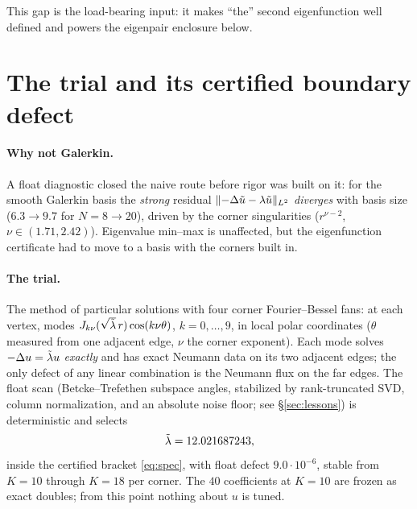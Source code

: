 \documentclass[11pt]{article}
\begin{document}
This gap is the load-bearing input: it makes ``the'' second
eigenfunction well defined and powers the eigenpair enclosure below.

\section{The trial and its certified boundary defect}\label{sec:trial}

\paragraph{Why not Galerkin.}
A float diagnostic closed the naive route before rigor was built on it:
for the smooth Galerkin basis the \emph{strong} residual
$\lVert -\Delta\tilde u-\lambda\tilde u \rVert_{L^2}$ \emph{diverges} with
basis size ($6.3\to9.7$ for $N=8\to20$), driven by the corner
singularities ($r^{\nu-2}$, $\nu\in(1.71,2.42)$). Eigenvalue min--max
is unaffected, but the eigenfunction certificate had to move to a basis
with the corners built in.

\paragraph{The trial.}
The method of particular solutions \cite{FHM,BetckeTrefethen} with four
corner Fourier--Bessel fans: at each vertex, modes
$J_{k\nu}(\sqrt{\tilde\lambda}\,r)\cos(k\nu\theta)$, $k=0,\dots,9$, in local
polar coordinates ($\theta$ measured from one adjacent edge, $\nu$ the
corner exponent). Each mode solves $-\Delta u=\tilde\lambda u$ \emph{exactly}
and has exact Neumann data on its two adjacent edges; the only defect
of any linear combination is the Neumann flux on the far edges. The
float scan (Betcke--Trefethen subspace angles, stabilized by
rank-truncated SVD, column normalization, and an absolute noise floor;
see \S\ref{sec:lessons}) is deterministic and selects
\[
\tilde\lambda = 12.021687243,
\]
inside the certified bracket \eqref{eq:spec}, with float defect
$9.0\cdot10^{-6}$, stable from $K{=}10$ through $K{=}18$ per corner.
The $40$ coefficients at $K{=}10$ are frozen as exact doubles; from
this point nothing about $u$ is tuned.
\end{document}
